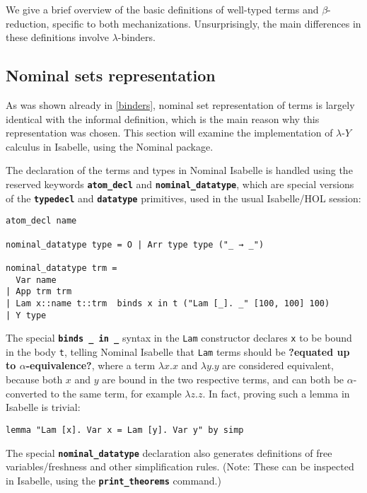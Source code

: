 \documentclass[a4paper, 12pt, twoside]{style/ociamthesis}
\theoremstyle{plain}
\theoremstyle{definition}
\theoremstyle{remark}
\newcommand{\lamy}{\lambda\text{-}Y}
\begin{document}
We give a brief overview of the basic definitions of well-typed terms
and \(\beta\)-reduction, specific to both mechanizations.
Unsurprisingly, the main differences in these definitions involve
\(\lambda\)-binders.

\subsection{Nominal sets
representation}\label{nominal-sets-representation}

As was shown already in \cref{binders}, nominal set representation of
terms is largely identical with the informal definition, which is the
main reason why this representation was chosen. This section will
examine the implementation of \(\lamy\) calculus in Isabelle, using the
Nominal package.

The declaration of the terms and types in Nominal Isabelle is handled
using the reserved keywords \textbf{\texttt{atom\_decl}} and
\textbf{\texttt{nominal\_datatype}}, which are special versions of the
\textbf{\texttt{typedecl}} and \textbf{\texttt{datatype}} primitives,
used in the usual Isabelle/HOL session:

\begin{verbatim}
atom_decl name

nominal_datatype type = O | Arr type type ("_ → _")

nominal_datatype trm =
  Var name
| App trm trm
| Lam x::name t::trm  binds x in t ("Lam [_]. _" [100, 100] 100)
| Y type
\end{verbatim}

The special \textbf{\texttt{binds \_ in \_}} syntax in the \texttt{Lam}
constructor declares \texttt{x} to be bound in the body \texttt{t},
telling Nominal Isabelle that \texttt{Lam} terms should be
\textbf{?equated up to \(\alpha\)-equivalence?}, where a term
\(\lambda x. x\) and \(\lambda y. y\) are considered equivalent, because
both \(x\) and \(y\) are bound in the two respective terms, and can both
be \(\alpha\)-converted to the same term, for example \(\lambda z .z\).
In fact, proving such a lemma in Isabelle is trivial:

\begin{verbatim}
lemma "Lam [x]. Var x = Lam [y]. Var y" by simp
\end{verbatim}

The special \textbf{\texttt{nominal\_datatype}} declaration also
generates definitions of free variables/freshness and other
simplification rules. (Note: These can be inspected in Isabelle, using
the \textbf{\texttt{print\_theorems}} command.)
\end{document}
